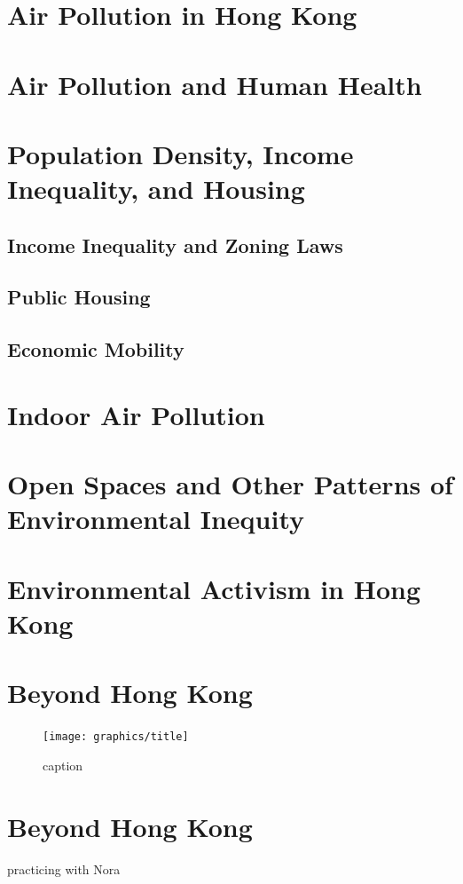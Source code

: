 \documentclass{book}\usepackage{knitr}
\begin{document}
\section{Air Pollution in Hong Kong}
\section{Air Pollution and Human Health}
\section{Population Density, Income Inequality, and Housing}
\subsection{Income Inequality and Zoning Laws}
\subsection{Public Housing}
\subsection{Economic Mobility}
\section{Indoor Air Pollution}
\section{Open Spaces and Other Patterns of Environmental Inequity}
\section{Environmental Activism in Hong Kong}

\section{Beyond Hong Kong}

\begin{figure}
\texttt{[image: graphics/title]}
\caption{caption}
\label{title}
\end{figure}

\section{Beyond Hong Kong}

practicing with Nora
\end{document}
